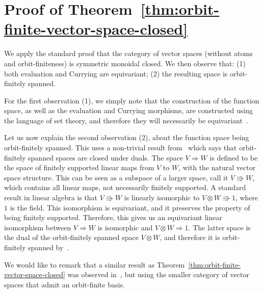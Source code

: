 \documentclass[10pt,a4paper]{amsart}
\numberwithin{equation}{section}
\theoremstyle{plain}
\newcommand{\funspace}[2]{#1 \Rightarrow #2}
\newcommand{\funspacenonfs}[2]{#1 \Rrightarrow  #2}
\begin{document}
\section{Proof of Theorem~\ref{thm:orbit-finite-vector-space-closed}}
 We apply the standard proof that the category of vector spaces (without atoms and orbit-finiteness) is symmetric monoidal closed. We then observe that: (1) both evaluation and Currying are equivariant; (2) the resulting space is orbit-finitely spanned. 
    
    For the first observation (1), we simply note that the construction of the function space, as well as  the evaluation and Currying morphisms, are constructed using the language of set theory, and therefore they will necessarily be equivariant~\cite[Equivariance Principle]{bojanczyk_slightly2018}.

    Let us now explain the second observation (2), about the function space being orbit-finitely spanned. This uses a non-trivial result from~\cite{bojanczykKM21OrbitFiniteVector} which says that orbit-finitely spanned spaces are closed under duals. 
    The space $\funspace V W$ is defined to be the space of finitely supported linear maps from $V$ to $W$, with the natural vector space structure. This can be seen as a subspace of a larger space, call it $\funspacenonfs V W$, which contains all linear maps, not necessarily finitely supported. A standard result in linear algebra is that $\funspacenonfs V W$ is linearly isomorphic to $ \funspacenonfs {V \otimes W} 1$, where $1$ is the field. This isomorphism is equivariant, and it preserves the property of being finitely supported. Therefore, this gives us an equivariant linear isomorphism between $\funspace V W$ is isomorphic and $ \funspace {V \otimes W} 1$. The latter space is the dual of the orbit-finitely spanned space $V \otimes W$, and therefore it is orbit-finitely spanned by~\cite[Corollary VI.5]{bojanczykKM21OrbitFiniteVector}.


    We would like to remark that a similar result as Theorem~\ref{thm:orbit-finite-vector-space-closed} was observed in~\cite[Theorem 3.8]{przybyłek2024note}, but using the smaller category of vector spaces that admit an orbit-finite basis. 
\end{document}
